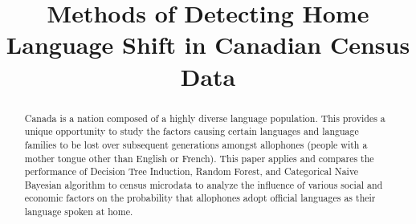 \documentclass[10pt, conference, compsocconf]{IEEEtran}
\begin{document}
%
\title{Methods of Detecting Home Language Shift in Canadian Census Data}



\author{
}


% 








\maketitle


\begin{abstract}
Canada is a nation composed of a highly diverse language population. This provides a unique opportunity to study the factors causing certain languages and language families to be lost over subsequent generations amongst allophones (people with a mother tongue other than English or French). This paper applies and compares the performance of Decision Tree Induction, Random Forest, and Categorical Naive Bayesian algorithm to census microdata to analyze the influence of various social and economic factors on the probability that allophones adopt official languages as their language spoken at home.

\end{abstract}
\end{document}
